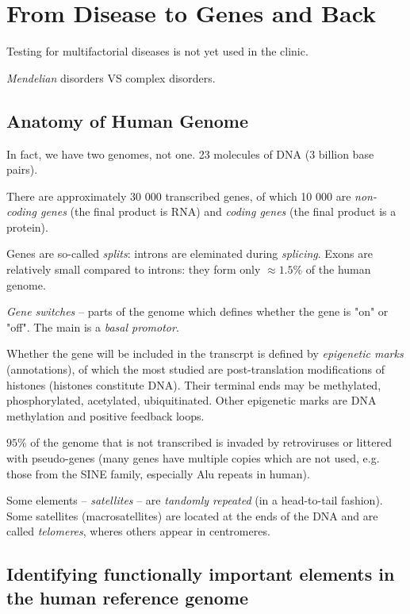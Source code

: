 \documentclass[main.tex]{subfiles}
\begin{document}
\section{From Disease to Genes and Back}

Testing for multifactorial diseases is not yet used in the clinic.

\emph{Mendelian} disorders VS complex disorders.

\subsection{Anatomy of Human Genome}

In fact, we have two genomes, not one.
23 molecules of DNA (3 billion base pairs).

There are approximately 30 000 transcribed genes, of which 10 000 are \emph{non-coding genes} (the final product is RNA) and \emph{coding genes} (the final product is a protein).

Genes are so-called \emph{splits}: introns are eleminated during \emph{splicing}.
Exons are relatively small compared to introns: they form only $\approx 1.5 \%$ of the human genome.

\emph{Gene switches} -- parts of the genome which defines whether the gene is "on" or "off".
The main is a \emph{basal promotor}.

Whether the gene will be included in the transcrpt is defined by \emph{epigenetic marks} (annotations), of which the most studied are post-translation modifications of histones (histones constitute DNA).
Their terminal ends may be methylated, phosphorylated, acetylated, ubiquitinated.
Other epigenetic marks are DNA methylation and positive feedback loops.

$95 \%$ of the genome that is not transcribed is invaded by retroviruses or littered with pseudo-genes (many genes have multiple copies which are not used, e.g. those from the SINE family, especially Alu repeats in human).

Some elements -- \emph{satellites} -- are \emph{tandomly repeated} (in a head-to-tail fashion).
Some satellites (macrosatellites) are located at the ends of the DNA and are called \emph{telomeres}, wheres others appear in centromeres.

\subsection{Identifying functionally important elements in the human reference genome}
\end{document}
